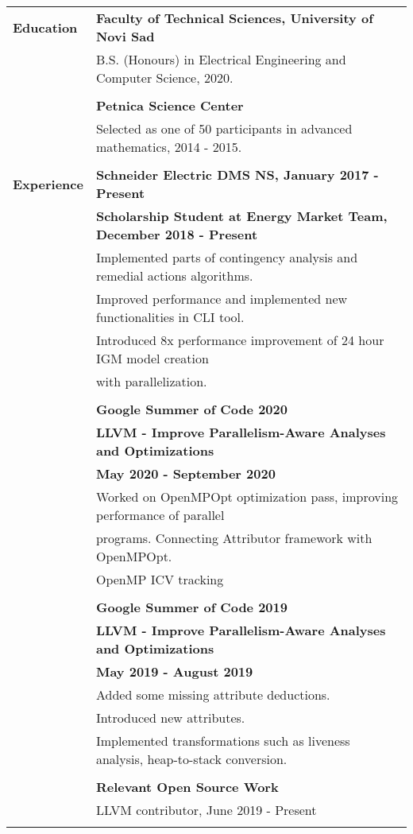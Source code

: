 \documentclass[letterpaper,11pt,oneside]{article}
\begin{document}
\noindent \begin{tabular}{@{} l l}
 \Large\textbf{Education}     & \textbf{Faculty of Technical Sciences, University of Novi Sad} \\
     & B.S. (Honours) in Electrical Engineering and Computer Science, 2020. \\ \\
     & \textbf{Petnica Science Center } \\
     & Selected as one of 50 participants in advanced mathematics, 2014 - 2015. \\ \\
 
 \Large\textbf{Experience}    & \textbf{Schneider Electric DMS NS, January 2017 - Present} \\
 & \textbf{Scholarship Student at Energy Market Team, December 2018 - Present} \\
     & Implemented parts of contingency analysis and remedial actions algorithms. \\
     & Improved performance and implemented new functionalities in CLI tool. \\
     & Introduced 8x performance improvement of 24 hour IGM model creation \\
     & with parallelization. \\
     & \\
     & \textbf{Google Summer of Code 2020} \\
     & \textbf{LLVM - Improve Parallelism-Aware Analyses and Optimizations } \\
     & \textbf{May 2020 - September 2020} \\
     & Worked on OpenMPOpt optimization pass, improving performance of parallel \\
     & programs. Connecting Attributor framework with OpenMPOpt. \\
     & OpenMP ICV tracking\\
     &\\
     &\textbf{Google Summer of Code 2019} \\
     & \textbf{LLVM - Improve Parallelism-Aware Analyses and Optimizations } \\
     & \textbf{May 2019 - August 2019} \\
     & Added some missing attribute deductions. \\
     & Introduced new attributes. \\
     & Implemented transformations such as liveness analysis, heap-to-stack conversion. \\
     & \\
     & \textbf{Relevant Open Source Work} \\
     & LLVM contributor, June 2019 - Present \\
     & \\
     

\end{tabular}
\end{document}
